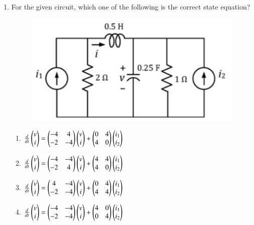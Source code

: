 \documentclass[a4paper, 11pt]{article}
\begin{document}
\begin{enumerate}
    \item For the given circuit, which one of the following is the correct state equation?
    \begin{figure}[H]
        \centering
        \includegraphics[width=0.6\columnwidth]{figs/Q30.png}
        \caption*{}
        \label{fig:q40}
    \end{figure}
    \begin{enumerate}
        \item $\frac{d}{dt}\begin{pmatrix}v \\ i\end{pmatrix} = \begin{pmatrix}-4 & 4 \\ -2 & -4\end{pmatrix}\begin{pmatrix}v \\ i\end{pmatrix} + \begin{pmatrix}0 & 4 \\ 4 & 0\end{pmatrix}\begin{pmatrix}i_1 \\ i_2\end{pmatrix}$
        \item $\frac{d}{dt}\begin{pmatrix}v \\ i\end{pmatrix} = \begin{pmatrix}-4 & -4 \\ -2 & 4\end{pmatrix}\begin{pmatrix}v \\ i\end{pmatrix} + \begin{pmatrix}4 & 4 \\ 4 & 0\end{pmatrix}\begin{pmatrix}i_1 \\ i_2\end{pmatrix}$
        \item $\frac{d}{dt}\begin{pmatrix}v \\ i\end{pmatrix} = \begin{pmatrix}4 & -4 \\ -2 & -4\end{pmatrix}\begin{pmatrix}v \\ i\end{pmatrix} + \begin{pmatrix}0 & 4 \\ 4 & 4\end{pmatrix}\begin{pmatrix}i_1 \\ i_2\end{pmatrix}$
        \item $\frac{d}{dt}\begin{pmatrix}v \\ i\end{pmatrix} = \begin{pmatrix}-4 & -4 \\ -2 & -4\end{pmatrix}\begin{pmatrix}v \\ i\end{pmatrix} + \begin{pmatrix}4 & 0 \\ 0 & 4\end{pmatrix}\begin{pmatrix}i_1 \\ i_2\end{pmatrix}$
    \end{enumerate}

    \hfill{}


\end{enumerate}
\end{document}
